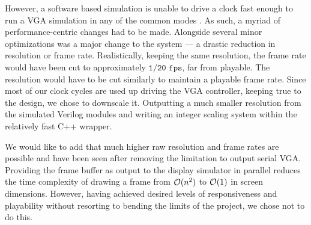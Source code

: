 However, a software based simulation is unable to drive a clock fast enough
to run a VGA simulation in any of the common modes \cite{vga_modes}. As such,
a myriad of performance-centric changes had to be made. Alongside several
minor optimizations was a major change to the system --- a drastic reduction in
resolution or frame rate. Realistically, keeping the same resolution, the frame 
rate would have been cut to approximately \(\texttt{1/20 fps}\), far from playable.
The resolution would have to be cut similarly to maintain a playable frame rate.
Since most of our clock cycles are used up driving the VGA controller, keeping true
to the design, we chose to downscale it. Outputting a much smaller resolution from
the simulated Verilog modules and writing an integer scaling \cite{intscale} system
within the relatively fast C++ wrapper. 

We would like to add that much higher raw resolution and frame rates are possible 
and have been seen after removing the limitation to output serial VGA. Providing
the frame buffer as output to the display simulator in parallel reduces the time
complexity of drawing a frame from \(\mathcal{O} (n^2)\) to \(\mathcal{O} (1)\) in screen 
dimensions. However, having achieved desired levels of responsiveness and 
playability without resorting to bending the limits of the project, we chose not 
to do this.